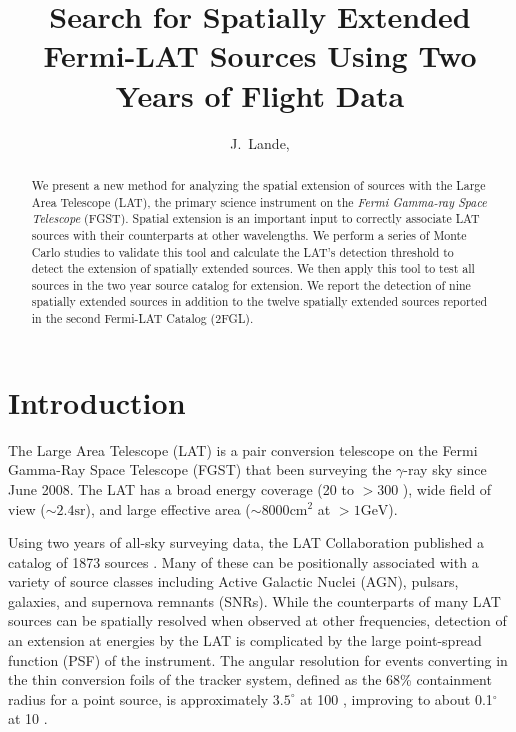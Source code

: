 \documentclass[12pt,preprint]{aastex}
\newcommand{\mev}{\text{MeV}\xspace}
\newcommand{\gev}{\text{GeV}\xspace}
\newcommand{\sr}{\text{sr}\xspace}
\newcommand{\cm}{\text{cm}\xspace}
\renewcommand{\approx}{\sim\!\xspace}
\begin{document}
\title{Search for Spatially Extended Fermi-LAT Sources Using Two Years of Flight
Data}

\author{
J.~Lande, 
}


\begin{abstract}
We present a new method for analyzing 
the spatial extension of sources with
the Large Area Telescope (LAT), the primary science instrument on the
{\em Fermi Gamma-ray Space Telescope} (FGST). 
Spatial extension
is an important input to correctly 
associate LAT sources with their counterparts at other
wavelengths. We perform
a series of Monte Carlo studies to validate this tool and calculate
the LAT's detection threshold to detect the extension of 
spatially extended sources.  We then
apply this tool to test all sources in the two year source catalog for
extension. We report the detection of nine spatially extended sources
in addition to the twelve spatially extended sources reported in the
second Fermi-LAT Catalog (2FGL).
\end{abstract}

\listoftodos

\section{Introduction}

The Large Area Telescope (LAT) is a pair conversion telescope on the Fermi
Gamma-Ray Space Telescope (FGST) that been surveying the $\gamma$-ray
sky since June 2008.  The LAT has a broad energy coverage (20 \mev to $>300$
\gev), wide field of view ($\approx 2.4 \sr$), and large effective area
($\approx 8000 \cm^2$ at $>1 \gev$).

Using two years of all-sky surveying data, the LAT Collaboration published
a catalog of 1873 \gev sources \citep{second_cat}. Many of these can be
positionally associated with a variety of source classes including Active
Galactic Nuclei (AGN), pulsars, galaxies, and supernova remnants (SNRs).
While the counterparts of many LAT sources
can be spatially resolved when observed
at other frequencies, detection of an extension at \gev energies by
the LAT is complicated by the large point-spread function (PSF)
of the instrument. The angular resolution for events converting in the
thin conversion foils of the tracker system, defined as the 68\% containment radius for
a point source, is approximately $3.5^{\circ}$ at 100 \mev, improving
to about 0.1$^{\circ}$ at 10 \gev.
\end{document}
